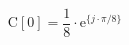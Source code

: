 \begin{center}
\[
\textrm{C}[0] = \frac{1}{8} \cdot \textrm{e}^{\{ j \cdot \pi/8 \}}
\]
\end{center}
